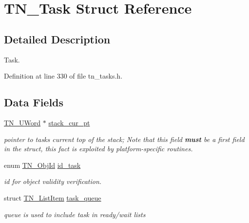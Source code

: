 \hypertarget{structTN__Task}{}\section{T\+N\+\_\+\+Task Struct Reference}
\label{structTN__Task}


\subsection{Detailed Description}
Task. 

Definition at line 330 of file tn\+\_\+tasks.\+h.

\subsection*{Data Fields}
\begin{DoxyCompactItemize}
\item 
\hyperlink{tn__arch__example_8h_ab80cba0fe9ffcd9011d53dfeb9e39bf4}{T\+N\+\_\+\+U\+Word} $\ast$ \hyperlink{structTN__Task_a9354fa4b328e10ee9f8adb032e643892}{stack\+\_\+cur\+\_\+pt}
\begin{DoxyCompactList}\small\item\em pointer to task\textquotesingle{}s current top of the stack; Note that this field {\bfseries must} be a first field in the struct, this fact is exploited by platform-\/specific routines. \end{DoxyCompactList}\item 
enum \hyperlink{tn__common_8h_ae779dd1f6735f6e139fb70acd004d976}{T\+N\+\_\+\+Obj\+Id} \hyperlink{structTN__Task_a014a0a70ae6a23d08b1571ac6b017abd}{id\+\_\+task}
\begin{DoxyCompactList}\small\item\em id for object validity verification. \end{DoxyCompactList}\item 
\mbox{\label{structTN__Task_a0772dfcd1f95d0ba10b9d2820fb9201b}} 
struct \hyperlink{structTN__ListItem}{T\+N\+\_\+\+List\+Item} \hyperlink{structTN__Task_a0772dfcd1f95d0ba10b9d2820fb9201b}{task\+\_\+queue}
\begin{DoxyCompactList}\small\item\em queue is used to include task in ready/wait lists \end{DoxyCompactList}\item 
\mbox{\label{structTN__Task_ac394d7ba177bab077969e9d96cddd8fb}} 

\end{DoxyCompactItemize}
